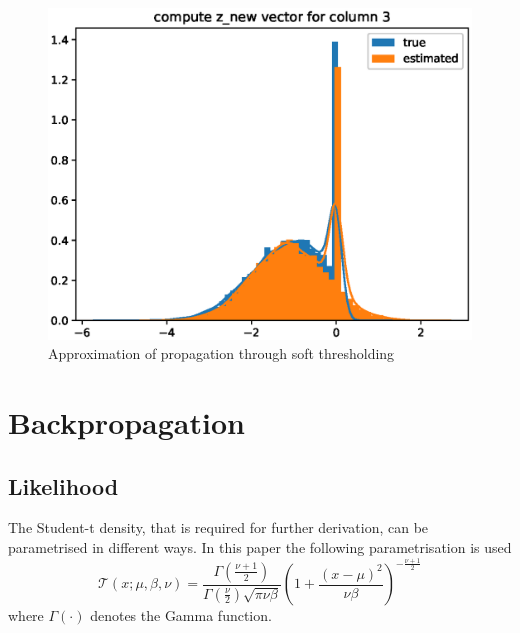 \documentclass[letterpaper]{article}
\begin{document}
\begin{figure}[t]
\includegraphics[width=\columnwidth]{z_new_testing}
\caption{Approximation of propagation through soft thresholding}
\label{fig:z_new_testing}
\end{figure}


\section{Backpropagation}
\label{sec:backpropagation}
\subsection{Likelihood}
The Student-t density, that is required for further derivation, can be parametrised in different ways. In this paper the following parametrisation is used 
\begin{equation}
\mathcal{T}(x; \mu, \beta, \nu) = \frac{\Gamma\left(\frac{\nu + 1}{2}\right)}{\Gamma\left(\frac{\nu}{2}\right)\sqrt{\pi \nu \beta}} \left(1 + \frac{(x - \mu)^2}{\nu\beta}\right)^{-\frac{\nu + 1}{2}}
\end{equation}
where $\Gamma(\cdot)$ denotes the Gamma function.
\end{document}
